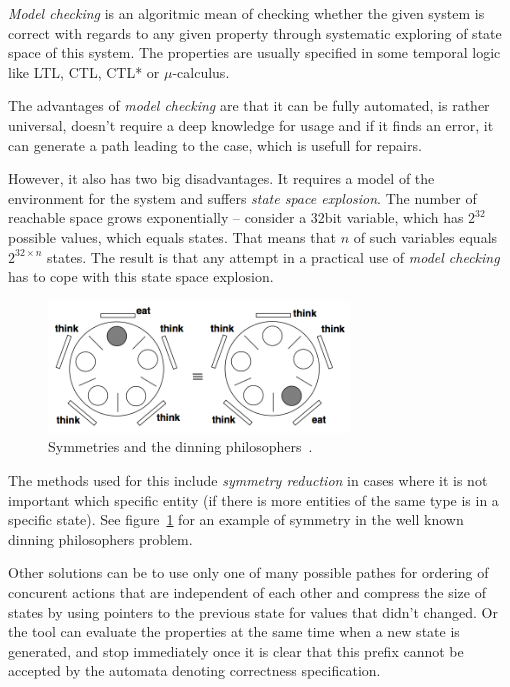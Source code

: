 {\em Model checking} is an algoritmic mean of checking whether the given system is correct with regards to any given property through systematic exploring of state space of this system. The properties are usually specified in some temporal logic like LTL, CTL, CTL* or $\mu$-calculus.

The advantages of {\em model checking} are that it can be fully automated, is rather universal, doesn't require a deep knowledge for usage and if it finds an error, it can generate a path leading to the case, which is usefull for repairs.

However, it also has two big disadvantages. It requires a model of the environment for the system and suffers {\em state space explosion}. The number of reachable space grows exponentially -- consider a 32bit variable, which has $2^{32}$ possible values, which equals states. That means that $n$ of such variables equals $2^{32\times n}$ states. The result is that any attempt in a practical use of {\em model checking} has to cope with this state space explosion.

\begin{figure}
  \centering
 \includegraphics[width=8cm,keepaspectratio]{fig/dinning-symmetry} %
\caption{Symmetries and the dinning philosophers~\cite{KrenaVojnarOverview}.}
\label{fig:fav:dinning}
\end{figure}

The methods used for this include {\em symmetry reduction} in cases where it is not important which specific entity (if there is more entities of the same type is in a specific state). See figure~\ref{fig:fav:dinning} for an example of symmetry in the well known dinning philosophers problem.

Other solutions can be to use only one of many possible pathes for ordering of concurent actions that are independent of each other and compress the size of states by using pointers to the previous state for values that didn't changed. Or the tool can evaluate the properties at the same time when a new state is generated, and stop immediately once it is clear that this prefix cannot be accepted by the automata denoting correctness specification.


